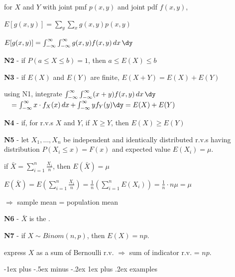 \documentclass[10pt, landscape]{article}
\makeatletter
\renewcommand{\subsubsection}{\@startsection{subsubsection}{3}{0mm}%
  {-1ex plus -.5ex minus -.2ex}%
  {1ex plus .2ex}%
{\normalfont\small\bfseries}}%
\makeatother
\begin{document}
\begin{multicols*}{3}
    \begin{center}
      for $X$ and $Y$ with joint pmf $p(x, y)$ and joint pdf  $f(x, y)$, 

      $E[g(x, y)] = \sum\limits_y \sum\limits_x g(x, y) p(x, y)$

      $ E[g(x, y)] = \int^\infty_{-\infty} \int^\infty_{-\infty} g(x, y) f(x, y) \dx \dy $
    \end{center}

    \textbf{N2} - if $P(a \leq X \leq b) = 1$, then $a \leq E(X) \leq b$

    \textbf{N3} - if $E(X)$ and $E(Y)$ are finite, $E(X+Y) = E(X) + E(Y)$

    \begin{niceproof}
      using N1, integrate $\int^\infty_{-\infty} \int^\infty_{-\infty} (x+y) f(x, y) \dx \dy$
      $\quad = \int^\infty_{-\infty} x \cdot f_X (x) \dx + \int^\infty_{-\infty} y f_Y(y) \dy = E(X) + E(Y)$
    \end{niceproof}

    \textbf{N4} - if, for r.v.s $X$ and $Y$, if $X \geq Y$, then $E(X) \geq E(Y)$

    \textbf{N5} - let $X_1, \dots, X_n$ be independent and identically distributed r.v.s having distribution $P(X_i \leq x) = F(x)$ and expected value $E(X_i) = \mu$. 
    \begin{tightcenter}
      if $\bar{X} = \sum\limits^n_{i=1} \frac{X_i}{n}$, then $E(\bar{X}) = \mu$
    \end{tightcenter}

    \begin{niceproof}
      $E(\bar{X}) = E (\sum\limits^n_{i=1} \frac{X_i}{n}) = \frac{1}{n} (\sum\limits^n_{i=1} E(X_i)) = \frac{1}{n} \cdot n\mu = \mu $

      $\Rightarrow$ sample mean = population mean
    \end{niceproof}

    \textbf{N6} - $\bar{X}$ is the .

    \textbf{N7} - if $X \sim Binom(n, p)$, then $E(X) = np$.

    \begin{niceproof}
      express $X$ as a sum of Bernoulli r.v. $\Rightarrow$ sum of indicator r.v. = $np$.
    \end{niceproof}

    \subsubsection{examples}


\end{multicols*}
\end{document}

